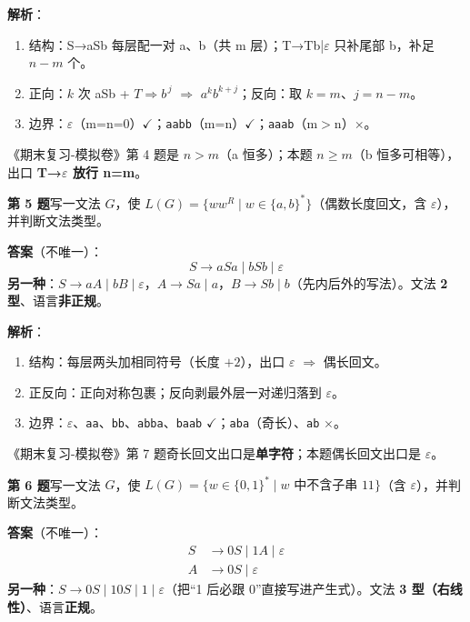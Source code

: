 \documentclass[12pt,a4paper,fontset=windows]{ctexart}
\newcommand{\ok}{\ensuremath{\checkmark}}
\newcommand{\bad}{\ensuremath{\times}}
\newcommand{\imp}{\ensuremath{\Rightarrow}}
\begin{document}
\textbf{解析}：
\begin{enumerate}
\item 结构：S→aSb 每层配一对 a、b（共 m 层）；T→Tb|$\varepsilon$ 只补尾部 b，补足 $n-m$ 个。
\item 正向：$k$ 次 aSb + $T \Rightarrow b^{\,j}$ \imp{} $a^k b^{k+j}$；反向：取 $k=m$、$j=n-m$。
\item 边界：$\varepsilon$（m=n=0）\ok；\texttt{aabb}（m=n）\ok；\texttt{aaab}（m$>$n）\bad。
\end{enumerate}

\begin{tipbox}[对比模拟卷第 4 题]
《期末复习-模拟卷》第 4 题是 $n>m$（a 恒多）；本题 $n \ge m$（b 恒多可相等），出口 \textbf{T→$\varepsilon$ 放行 n=m}。
\end{tipbox}

\begin{qbox}
{\large\bfseries 第 5 题}\quad 写一文法 $G$，使 $L(G)=\{ww^R \mid w \in \{a,b\}^*\}$（偶数长度回文，含 $\varepsilon$），并判断文法类型。
\end{qbox}

\textbf{答案}（不唯一）：
\[
S \to aSa \mid bSb \mid \varepsilon
\]
\textbf{另一种}：$S \to aA \mid bB \mid \varepsilon$，$A \to Sa \mid a$，$B \to Sb \mid b$（先内后外的写法）。文法 \textbf{2 型}、语言\textbf{非正规}。

\textbf{解析}：
\begin{enumerate}
\item 结构：每层两头加相同符号（长度 $+2$），出口 $\varepsilon$ \imp{} 偶长回文。
\item 正反向：正向对称包裹；反向剥最外层一对递归落到 $\varepsilon$。
\item 边界：$\varepsilon$、\texttt{aa}、\texttt{bb}、\texttt{abba}、\texttt{baab} \ok；\texttt{aba}（奇长）、\texttt{ab} \bad。
\end{enumerate}

\begin{tipbox}[出口决定奇偶]
《期末复习-模拟卷》第 7 题奇长回文出口是\textbf{单字符}；本题偶长回文出口是 \textbf{$\varepsilon$}。
\end{tipbox}

\begin{qbox}
{\large\bfseries 第 6 题}\quad 写一文法 $G$，使 $L(G)=\{w \in \{0,1\}^* \mid w \text{ 中不含子串 } 11\}$（含 $\varepsilon$），并判断文法类型。
\end{qbox}

\textbf{答案}（不唯一）：
\[
\begin{aligned}
S &\to 0S \mid 1A \mid \varepsilon\\
A &\to 0S \mid \varepsilon
\end{aligned}
\]
\textbf{另一种}：$S \to 0S \mid 10S \mid 1 \mid \varepsilon$（把``1 后必跟 0''直接写进产生式）。文法 \textbf{3 型（右线性）}、语言\textbf{正规}。
\end{document}
